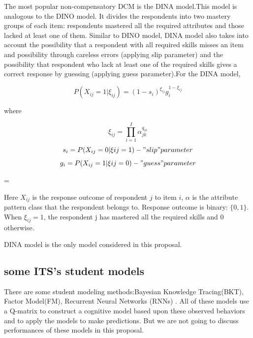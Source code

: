 \documentclass[12pt]{article}
\begin{document}
 The most popular non-compensatory DCM is the DINA model.This model is analogous to the DINO model. It divides the respondents into two mastery groups of each item: respondents mastered all the required attributes and those lacked at least one of them. Similar to DINO model, DINA model also takes into account the possibility that a respondent with all required skills misses an item and possibility through careless errors (applying slip parameter) and the possibility that respondent who lack at least one of the required skills gives a correct response by guessing (applying guess parameter).For the DINA model, 
 
  
$$P (X_{ij}=1|\xi_{ij})=(1-s_i)^{\xi_{ij}}g_i^{1-\xi_{ij}}$$  

where 

$$\xi_{ij}=\prod\limits_{i=1}^I \alpha_{jk}^{q_{ik}}$$
$$ s_i= P(X_{ij}=0|\xi{ij}=1)-"slip" parameter $$
$$ g_i= P(X_{ij}=1|\xi{ij}=0)-"guess" parameter $$




  
\parskip = \baselineskip


Here $X_{ij}$ is the response outcome of respondent $j$ to item $i$, $\alpha$ is the attribute pattern class that the respondent belongs to. Response outcome is binary: $\{0,1\}$. When $\xi_{ij}=1$, the respondent j has mastered all the required skills and 0 otherwise. 

DINA model is the only model considered in this proposal.  
  
\subsection{some ITS's student models}
 There are some student modeling methods:Bayesian Knowledge Tracing(BKT), Factor Model(FM)\cite{cen2006learning,cen2008comparing,pavlik2009performance,chi2011instructional}, Recurrent Neural Networks (RNNs) \cite{piech2015deep}. All of these models use a Q-matrix to construct a cognitive model based upon these observed behaviors and to apply the models to make predictions. But we are not going to discuss performances of these models in this proposal.
\end{document}
